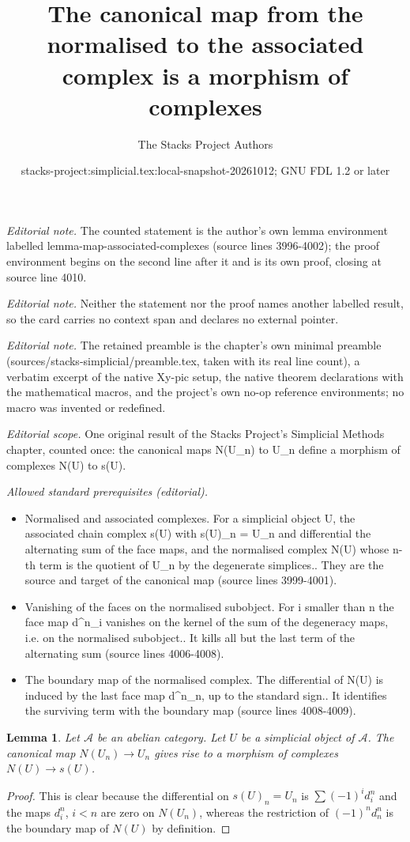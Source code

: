 \documentclass{stacks-project}
\title{The canonical map from the normalised to the associated complex is a morphism of complexes}
\author{The Stacks Project Authors}
\date{stacks-project:simplicial.tex:local-snapshot-20261012; GNU FDL 1.2 or later}
\theoremstyle{plain}
\newtheorem{lemma}[subsection]{Lemma}
\theoremstyle{definition}
\theoremstyle{remark}
\numberwithin{equation}{subsection}
\begin{document}
\maketitle
\noindent\textit{Editorial note.} The counted statement is the author's own lemma environment labelled lemma-map-associated-complexes (source lines 3996-4002); the proof environment begins on the second line after it and is its own proof, closing at source line 4010.\par\medskip
\noindent\textit{Editorial note.} Neither the statement nor the proof names another labelled result, so the card carries no context span and declares no external pointer.\par\medskip
\noindent\textit{Editorial note.} The retained preamble is the chapter's own minimal preamble (sources/stacks-simplicial/preamble.tex, taken with its real line count), a verbatim excerpt of the native Xy-pic setup, the native theorem declarations with the mathematical macros, and the project's own no-op reference environments; no macro was invented or redefined.\par\medskip
\noindent\textit{Editorial scope.} One original result of the Stacks Project's Simplicial Methods chapter, counted once: the canonical maps N(U\_n) to U\_n define a morphism of complexes N(U) to s(U).\par\medskip
\noindent\textit{Allowed standard prerequisites (editorial).}\begin{itemize}
\item Normalised and associated complexes. For a simplicial object U, the associated chain complex s(U) with s(U)\_n = U\_n and differential the alternating sum of the face maps, and the normalised complex N(U) whose n-th term is the quotient of U\_n by the degenerate simplices.. They are the source and target of the canonical map (source lines 3999-4001).
\item Vanishing of the faces on the normalised subobject. For i smaller than n the face map d\textasciicircum{}n\_i vanishes on the kernel of the sum of the degeneracy maps, i.e. on the normalised subobject.. It kills all but the last term of the alternating sum (source lines 4006-4008).
\item The boundary map of the normalised complex. The differential of N(U) is induced by the last face map d\textasciicircum{}n\_n, up to the standard sign.. It identifies the surviving term with the boundary map (source lines 4008-4009).
\end{itemize}\medskip
\begin{lemma}
\label{lemma-map-associated-complexes}
Let $\mathcal{A}$ be an abelian category.
Let $U$ be a simplicial object of $\mathcal{A}$.
The canonical map $N(U_n) \to U_n$ gives rise to
a morphism of complexes $N(U) \to s(U)$.
\end{lemma}

\begin{proof}
This is clear because the differential
on $s(U)_n = U_n$ is $\sum (-1)^i d^n_i$ and
the maps $d^n_i$, $i < n$ are zero on $N(U_n)$,
whereas the restriction of $(-1)^nd^n_n$ is the boundary
map of $N(U)$ by definition.
\end{proof}
\end{document}
